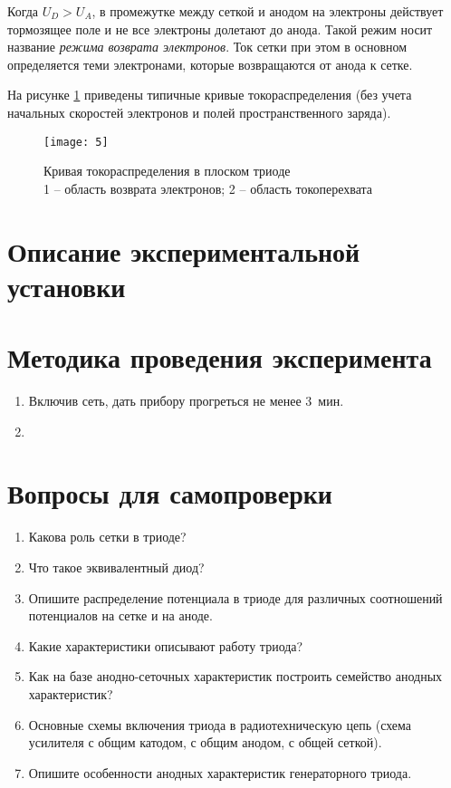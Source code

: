 Когда \( U_D > U_A \), в промежутке между сеткой и анодом на электроны
действует тормозящее поле и не все электроны долетают до анода. Такой режим
носит название \emph{режима возврата электронов}. Ток сетки при этом в основном
определяется теми электронами, которые возвращаются от анода к сетке.

На рисунке \ref{pic5} приведены типичные кривые токораспределения (без учета
начальных скоростей электронов и полей пространственного заряда).

\begin{figure}[ht]
    \center
    \texttt{[image: 5]}
    \caption{Кривая токораспределения в плоском триоде\\
    1 -- область возврата электронов; 2 -- область токоперехвата}
    \label{pic5}
\end{figure}

\section{Описание экспериментальной установки}

\section{Методика проведения эксперимента}
\renewcommand{\labelenumi}{4.\arabic{enumi}.}
\begin{enumerate}
    \item Включив сеть, дать прибору прогреться не менее 3~мин.
    \item 
\end{enumerate}

\section*{Вопросы для самопроверки}
\vspace{-1.5em}
\renewcommand{\labelenumi}{\arabic{enumi}.}
\begin{enumerate}
    \singlespacing
    \itemsep -.5pt
    \item Какова роль сетки в триоде?
    \item Что такое эквивалентный диод?
    \item Опишите распределение потенциала в триоде для различных соотношений
    потенциалов на сетке и на аноде.
    \item Какие характеристики описывают работу триода?
    \item Как на базе анодно-сеточных характеристик построить семейство
    анодных характеристик?
    \item Основные схемы включения триода в радиотехническую цепь (схема
    усилителя с общим катодом, с общим анодом, с общей сеткой).
    \item Опишите особенности анодных характеристик генераторного триода.
\end{enumerate}

